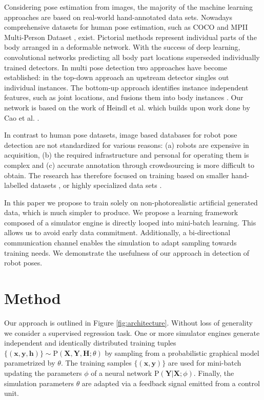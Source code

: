 \documentclass[conference]{IEEEtran}
\begin{document}
Considering pose estimation from images, the majority of the machine learning approaches are based on real-world hand-annotated data sets. Nowadays comprehensive datasets for human pose estimation, such as COCO \cite{lin2014microsoft} and MPII Multi-Person Dataset \cite{andriluka20142d}, exist. Pictorial methods \cite{fischler1973representation, felzenszwalb2005pictorial} represent individual parts of the body arranged in a deformable network. With the success of deep learning, convolutional networks \cite{oliveira2016deep} predicting all body part locations superseded individually trained detectors. In multi pose detection two approaches have become established: in the top-down approach \cite{gkioxari2014using, sun2011articulated} an upstream detector singles out individual instances. The bottom-up approach identifies instance independent features, such as joint locations, and fusions them into body instances \cite{insafutdinov2016deepercut, wei2016convolutional}. Our network is based on the work of Heindl et al. \cite{cheind2019disp} which builds upon work done by Cao et al. \cite{cao2017realtime}.

In contrast to human pose datasets, image based databases for robot pose detection are not standardized for various reasons: (a) robots are expensive in acquisition, (b) the required infrastructure and personal for operating them is complex and (c) accurate annotation through crowdsourcing is more difficult to obtain. The research has therefore focused on training based on smaller hand-labelled datasets \cite{miseikis2018multi, miseikis2018transfer, garcia2013guidance, varhegyivisual}, or highly specialized data sets \cite{levine2018learning}.

In this paper we propose to train solely on non-photorealistic artificial generated data, which is much simpler to produce. We propose a learning framework composed of a simulator engine is directly looped into mini-batch learning. This allows us to avoid early data commitment. Additionally, a bi-directional communication channel enables the simulation to adapt sampling towards training needs. We demonstrate the usefulness of our approach in detection of robot poses.


\section{Method}

    Our approach is outlined in Figure \ref{fig:architecture}. Without loss of generality we consider a supervised regression task. One or more simulator engines generate independent and identically distributed training tuples $\{(\textbf{x},\textbf{y},\textbf{h})\} \sim \mathrm{P}(\textbf{X},\textbf{Y},\textbf{H};\theta)$ by sampling from a probabilistic graphical model parametrized by $\theta$. The training samples $\{(\textbf{x},\textbf{y})\}$ are used for mini-batch updating the parameters $\phi$ of a neural network $\mathrm{P}(\textbf{Y} \lvert \textbf{X};\phi)$. Finally, the simulation parameters $\theta$ are adapted via a feedback signal emitted from a control unit.
\end{document}
